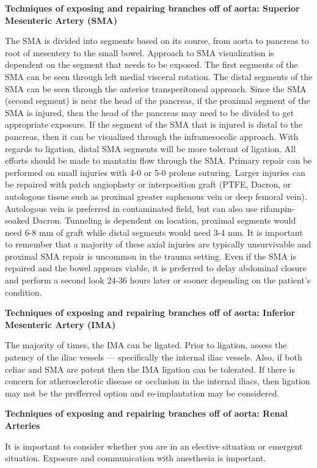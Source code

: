 \documentclass[
]{book}
\begin{document}
\textbf{Techniques of exposing and repairing branches off of aorta: Superior
Mesenteric Artery (SMA)}

The SMA is divided into segments based on its course, from aorta to
pancreas to root of mesentery to the small bowel. Approach to SMA
visualization is dependent on the segment that needs to be exposed. The
first segments of the SMA can be seen through left medial visceral
rotation. The distal segments of the SMA can be seen through the
anterior transperitoneal approach. Since the SMA (second segment) is
near the head of the pancreas, if the proximal segment of the SMA is
injured, then the head of the pancreas may need to be divided to get
appropriate exposure. If the segment of the SMA that is injured is
distal to the pancreas, then it can be visualized through the
inframesocolic approach. With regards to ligation, distal SMA segments
will be more tolerant of ligation. All efforts should be made to
mantatin flow through the SMA. Primary repair can be performed on small
injuries with 4-0 or 5-0 prolene suturing. Larger injuries can be
repaired with patch angioplasty or interposition graft (PTFE, Dacron, or
autologous tissue such as proximal greater saphenous vein or deep
femoral vein). Autologous vein is preferred in contaminated field, but
can also use rifampin-soaked Dacron. Tunneling is dependent on location,
proximal segments would need 6-8 mm of graft while distal segments would
need 3-4 mm. It is important to remember that a majority of these axial
injuries are typically unsurvivable and proximal SMA repair is uncommon
in the trauma setting. Even if the SMA is repaired and the bowel appears
viable, it is preferred to delay abdominal closure and perform a second
look 24-36 hours later or sooner depending on the patient's condition.

\textbf{Techniques of exposing and repairing branches off of aorta: Inferior
Mesenteric Artery (IMA)}

The majority of times, the IMA can be ligated. Prior to ligation, assess
the patency of the iliac vessels --- specifically the internal iliac
vessels. Also, if both celiac and SMA are patent then the IMA ligation
can be tolerated. If there is concern for atherosclerotic disease or
occlusion in the internal iliacs, then ligation may not be the
prefferred option and re-implantation may be considered.

\textbf{Techniques of exposing and repairing branches off of aorta: Renal
Arteries}

It is important to consider whether you are in an elective situation or
emergent situation. Exposure and communication with anesthesia is
important.
\end{document}
